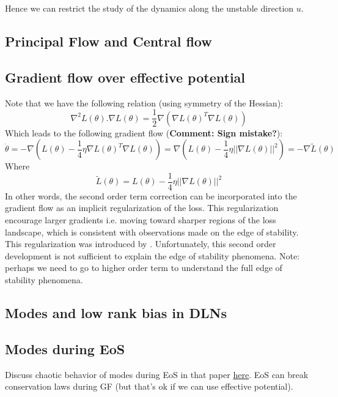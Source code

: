 \documentclass[11pt]{article}
\begin{document}
Hence we can restrict the study of the dynamics along the unstable direction $u$. 







\subsection*{Principal Flow and Central flow}


\subsection*{Gradient flow over effective potential}
Note that we have the following relation (using symmetry of the Hessian):
\begin{equation}
\nabla^2 L(\theta).\nabla L(\theta) = \frac{1}{2} \nabla (\nabla L(\theta)^T \nabla L(\theta)) 
\end{equation}
Which leads to the following gradient flow (\textbf{Comment: Sign mistake?}):
\begin{equation}
      \dot{\theta} = - \nabla (L(\theta) -\frac{1}{4} \eta \nabla L(\theta)^T \nabla L(\theta)) = \nabla (L(\theta) -\frac{1}{4} \eta ||\nabla L(\theta)||^2) = - \nabla \tilde{L}(\theta)
\end{equation}
Where $$\tilde{L}(\theta) = L(\theta) -\frac{1}{4} \eta ||\nabla L(\theta)||^2$$ In other words, the second order term correction can be incorporated into the gradient flow as an implicit regularization of the loss. This regularization encourage larger gradients i.e. moving toward sharper regions of the loss landscape, which is consistent with observations made on the edge of stability. This regularization was introduced by \citet{barrett2020implicit}. Unfortunately, this second order development is not sufficient to explain the edge of stability phenomena. Note: perhaps we need to go to higher order term to understand the full edge of stability phenomena.
\subsection*{Modes and low rank bias in DLNs}

\subsection*{Modes during EoS}
Discuss chaotic behavior of modes during EoS in that paper \href{https://openreview.net/pdf?id=J4Dvxv7WnG}{here}. EoS can break conservation laws during GF (but that's ok if we can use effective potential).
\end{document}
